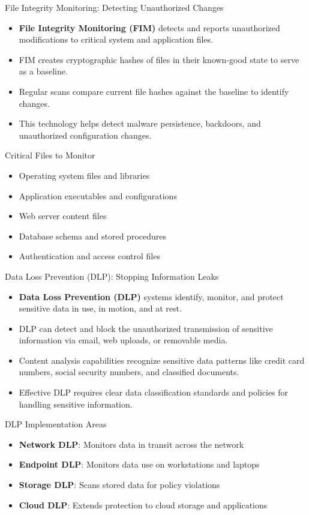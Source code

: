 \documentclass{beamer}
\begin{document}
\begin{frame}{File Integrity Monitoring: Detecting Unauthorized Changes}
\begin{itemize}
\item \textbf{File Integrity Monitoring (FIM)} detects and reports unauthorized modifications to critical system and application files.
\item FIM creates cryptographic hashes of files in their known-good state to serve as a baseline.
\item Regular scans compare current file hashes against the baseline to identify changes.
\item This technology helps detect malware persistence, backdoors, and unauthorized configuration changes.
\end{itemize}

\begin{alertblock}{Critical Files to Monitor}
\begin{itemize}
\item Operating system files and libraries
\item Application executables and configurations
\item Web server content files
\item Database schema and stored procedures
\item Authentication and access control files
\end{itemize}
\end{alertblock}
\end{frame}

\begin{frame}{Data Loss Prevention (DLP): Stopping Information Leaks}
\begin{itemize}
\item \textbf{Data Loss Prevention (DLP)} systems identify, monitor, and protect sensitive data in use, in motion, and at rest.
\item DLP can detect and block the unauthorized transmission of sensitive information via email, web uploads, or removable media.
\item Content analysis capabilities recognize sensitive data patterns like credit card numbers, social security numbers, and classified documents.
\item Effective DLP requires clear data classification standards and policies for handling sensitive information.
\end{itemize}

\begin{block}{DLP Implementation Areas}
\begin{itemize}
\item \textbf{Network DLP}: Monitors data in transit across the network
\item \textbf{Endpoint DLP}: Monitors data use on workstations and laptops
\item \textbf{Storage DLP}: Scans stored data for policy violations
\item \textbf{Cloud DLP}: Extends protection to cloud storage and applications
\end{itemize}
\end{block}
\end{frame}
\end{document}
